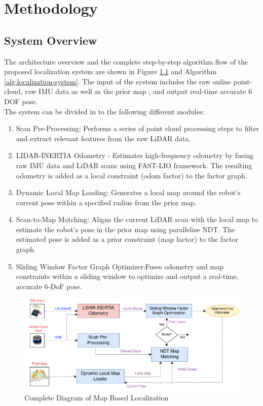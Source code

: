 \chapter{Methodology}
\label{ch:intro}

\section{System Overview}

The architecture overview and the complete step-by-step algorithm flow of the proposed localization system are shown in Figure \ref{fig:diagram-map-basedlocalization} and Algorithm \ref{alg:localization-system}. The input of the system includes the raw online point-cloud, raw IMU data as well as the prior map , and output real-time accurate 6 DOF pose.\\	
The system can be divided in to the following different modules:
\begin{enumerate}
	\item Scan Pre-Processing: Performs a series of point cloud processing steps to filter and extract relevant features from the raw LiDAR data.
	
	\item LIDAR-INERTIA Odometry - Estimates high-frequency odometry by fusing raw IMU data and LiDAR scans using FAST-LIO\cite{xuFastLIO2} framework. The resulting odometry is added as a local constraint (odom factor) to the factor graph.
	
	\item Dynamic Local Map Loading: Generates a local map around the robot’s current pose within a specified radius from the prior map.
	
	
	\item Scan-to-Map Matching: Aligns the current LiDAR scan with the local map to estimate the robot's pose in the prior map using parallelize NDT. The estimated pose is added as a prior constraint (map factor) to the factor graph.
	
	\item Sliding Window Factor Graph Optimizer:Fuses odometry and map constraints within a sliding window to optimize and output a real-time, accurate 6-DoF pose.
	
	
\end{enumerate}

\begin{figure}
    \centering
    \includegraphics[width=1\linewidth]{images/system-overview.png}
    \caption{Complete Diagram of Map Based Localization}
    \label{fig:diagram-map-basedlocalization}
\end{figure}


